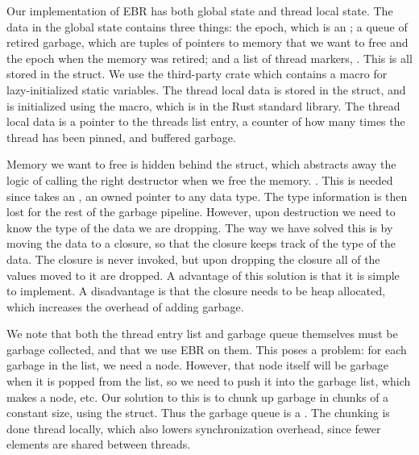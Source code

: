 \documentclass[b5paper]{report}
\begin{document}
Our implementation of EBR has both global state and thread local state. The data
in the global state contains three things: the epoch, which is an
; a queue of retired garbage, which are tuples of pointers to
memory that we want to free and the epoch when the memory was retired; and a
list of thread markers, . This is all stored in the
 struct. We use the third-party crate 
which contains a macro for lazy-initialized static variables. The thread local
data is stored in the  struct, and is initialized using the
 macro, which is in the Rust standard library. The thread
local data is a pointer to the threads list entry, a counter of how many times
the thread has been pinned, and buffered garbage.

Memory we want to free is hidden behind the  struct, which
abstracts away the logic of calling the right destructor when we free the
memory. . This is needed since
 takes an , an owned pointer to
any data type. The type information is then lost for the rest of the garbage
pipeline. However, upon destruction we need to know the type of the data we are
dropping. The way we have solved this is by moving the data to a closure, so
that the closure keeps track of the type of the data. The closure is never
invoked, but upon dropping the closure all of the values moved to it are
dropped. A advantage of this solution is that it is simple to implement. A
disadvantage is that the closure needs to be heap allocated, which increases the
overhead of adding garbage.  

We note that both the thread entry list and garbage queue themselves must be garbage
collected, and that we use EBR on them. This poses a problem: for each
garbage in the list, we need a node. However, that node itself will be garbage
when it is popped from the list, so we need to push it into the garbage list,
which makes a node, etc. Our solution to this is to chunk up garbage in chunks
of a constant size, using the  struct. Thus the garbage queue is a
. The chunking is done thread locally, which also
lowers synchronization overhead, since fewer elements are shared between threads.
\end{document}
